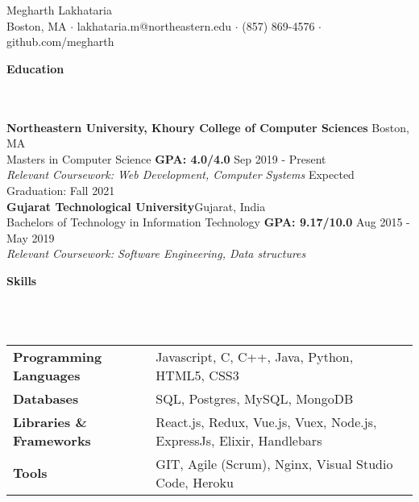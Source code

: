 \documentclass[]{article}
\newcommand{\lineunder} {
    \vspace*{-8pt} \\
    \hrulefill \\
}
\newcommand{\header} [1] {
    {\vspace*{6pt} \fontsize{12}{12}\selectfont \textbf{#1}}
     \lineunder
}
\begin{document}
\vspace*{-40pt}

    

\begin{center}
	{\LARGE {Megharth Lakhataria}}\\
	Boston, MA $\cdot$ lakhataria.m@northeastern.edu $\cdot$ (857) 869-4576 $\cdot$ github.com/megharth\\
\end{center}

\header{Education}
\hspace{1mm}
\textbf{Northeastern University, Khoury College of Computer Sciences}
\hfill
Boston, MA\\
\hspace{1mm}
Masters in Computer Science \textbf{GPA: 4.0/4.0} \hfill Sep 2019 - Present\\
\hspace{1mm}
\textit{Relevant Coursework: Web Development, Computer Systems} \hfill Expected Graduation: Fall 2021\\
\vspace{1mm}
\hspace{1mm}
\textbf{Gujarat Technological University}\hfill Gujarat, India\\
\hspace{1mm}
Bachelors of Technology in Information Technology \textbf{GPA: 9.17/10.0}  \hfill Aug 2015 - May 2019 \\
\hspace{1mm}
\textit{Relevant Coursework: Software Engineering, Data structures} \\
\vspace{1mm}


\header{Skills}
\vspace{1mm}
\begin{tabular}{ l l }
	\textbf{Programming Languages} & Javascript, C, C++, Java, Python, HTML5, CSS3            \\
	\textbf{Databases}             & SQL, Postgres, MySQL, MongoDB                            \\
    
    \textbf{Libraries \& Frameworks} & React.js, Redux, Vue.js, Vuex, Node.js, ExpressJs, Elixir, Handlebars \\
    
    \textbf{Tools}                & GIT, Agile (Scrum), Nginx, Visual Studio Code, Heroku \\          
\end{tabular}
\end{document}
